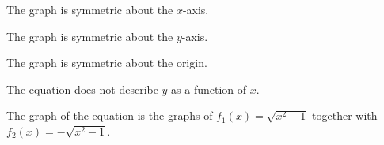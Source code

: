 \documentclass{ximera}
\begin{document}
\begin{multicols}{2}
\begin{enumerate}
\begin{flushleft}
\smallskip

The graph is symmetric about the $x$-axis. \smallskip

The graph is symmetric about the $y$-axis. \smallskip

The graph is symmetric about the origin.  \smallskip

The equation does not describe $y$ as a function of $x$.  \smallskip

The graph of the equation is the graphs of $f_{1}(x) = \sqrt{x^2-1}$ together with $f_{2}(x) = -\sqrt{x^2-1}$.


\end{flushleft}

\setcounter{HW}{\value{enumi}}
\end{enumerate}
\end{multicols}

\pagebreak
\end{document}
